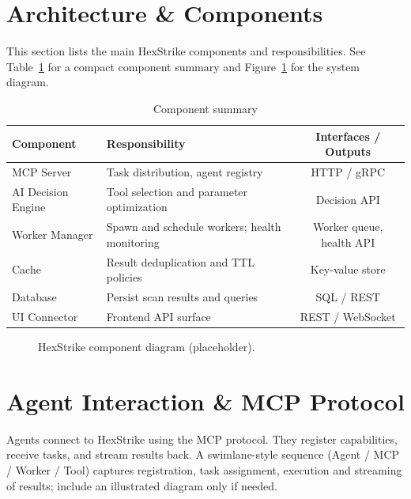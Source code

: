 
\section{Architecture \& Components}

This section lists the main HexStrike components and responsibilities. See Table~\ref{tab:components} for a compact component summary and Figure~\ref{fig:components} for the system diagram.

\begin{table}[ht]
\centering
\caption{Component summary}
\label{tab:components}
\begin{tabularx}{\textwidth}{|l|X|c|}
\hline
Component & Responsibility & Interfaces / Outputs \\
\hline
MCP Server & Task distribution, agent registry & HTTP / gRPC \\
\hline
AI Decision Engine & Tool selection and parameter optimization & Decision API \\
\hline
Worker Manager & Spawn and schedule workers; health monitoring & Worker queue, health API \\
\hline
Cache & Result deduplication and TTL policies & Key-value store \\
\hline
Database & Persist scan results and queries & SQL / REST \\
\hline
UI Connector & Frontend API surface & REST / WebSocket \\
\hline
\end{tabularx}
\end{table}

\begin{figure}[ht]
\centering
{}
\caption{HexStrike component diagram (placeholder).}
\label{fig:components}
\end{figure}

\section{Agent Interaction \& MCP Protocol}

Agents connect to HexStrike using the MCP protocol. They register capabilities, receive tasks, and stream results back. A swimlane-style sequence (Agent / MCP / Worker / Tool) captures registration, task assignment, execution and streaming of results; include an illustrated diagram only if needed.


